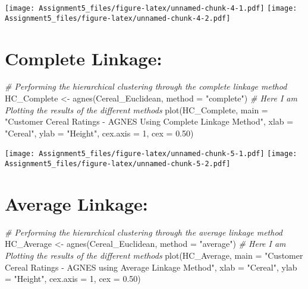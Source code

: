 \documentclass[
]{article}
\newenvironment{Shaded}{\begin{snugshade}}{\end{snugshade}}
\newcommand{\AttributeTok}[1]{\textcolor[rgb]{0.77,0.63,0.00}{#1}}
\newcommand{\CommentTok}[1]{\textcolor[rgb]{0.56,0.35,0.01}{\textit{#1}}}
\newcommand{\DecValTok}[1]{\textcolor[rgb]{0.00,0.00,0.81}{#1}}
\newcommand{\FloatTok}[1]{\textcolor[rgb]{0.00,0.00,0.81}{#1}}
\newcommand{\FunctionTok}[1]{\textcolor[rgb]{0.00,0.00,0.00}{#1}}
\newcommand{\NormalTok}[1]{#1}
\newcommand{\OtherTok}[1]{\textcolor[rgb]{0.56,0.35,0.01}{#1}}
\newcommand{\StringTok}[1]{\textcolor[rgb]{0.31,0.60,0.02}{#1}}
\begin{document}
\texttt{[image: Assignment5\_files/figure-latex/unnamed-chunk-4-1.pdf]}
\texttt{[image: Assignment5\_files/figure-latex/unnamed-chunk-4-2.pdf]}

\hypertarget{complete-linkage}{%
\section{Complete Linkage:}\label{complete-linkage}}

\begin{Shaded}
\begin{Highlighting}[]
\CommentTok{\# Performing the hierarchical clustering through the complete linkage method}
\NormalTok{HC\_Complete }\OtherTok{\textless{}{-}} \FunctionTok{agnes}\NormalTok{(Cereal\_Euclidean, }\AttributeTok{method =} \StringTok{"complete"}\NormalTok{)}
\CommentTok{\# Here I am Plotting the results of the different methods}
\FunctionTok{plot}\NormalTok{(HC\_Complete, }
     \AttributeTok{main =} \StringTok{"Customer Cereal Ratings {-} AGNES  Using Complete Linkage Method"}\NormalTok{,}
     \AttributeTok{xlab =} \StringTok{"Cereal"}\NormalTok{,}
     \AttributeTok{ylab =} \StringTok{"Height"}\NormalTok{,}
     \AttributeTok{cex.axis =} \DecValTok{1}\NormalTok{,}
     \AttributeTok{cex =} \FloatTok{0.50}\NormalTok{)}
\end{Highlighting}
\end{Shaded}

\texttt{[image: Assignment5\_files/figure-latex/unnamed-chunk-5-1.pdf]}
\texttt{[image: Assignment5\_files/figure-latex/unnamed-chunk-5-2.pdf]}

\hypertarget{average-linkage}{%
\section{Average Linkage:}\label{average-linkage}}

\begin{Shaded}
\begin{Highlighting}[]
\CommentTok{\# Performing the hierarchical clustering through the average linkage method}
\NormalTok{HC\_Average }\OtherTok{\textless{}{-}} \FunctionTok{agnes}\NormalTok{(Cereal\_Euclidean, }\AttributeTok{method =} \StringTok{"average"}\NormalTok{)}
\CommentTok{\# Here I am Plotting the results of the different methods}
\FunctionTok{plot}\NormalTok{(HC\_Average, }
     \AttributeTok{main =} \StringTok{"Customer Cereal Ratings {-} AGNES using Average Linkage Method"}\NormalTok{,}
     \AttributeTok{xlab =} \StringTok{"Cereal"}\NormalTok{,}
     \AttributeTok{ylab =} \StringTok{"Height"}\NormalTok{,}
     \AttributeTok{cex.axis =} \DecValTok{1}\NormalTok{,}
     \AttributeTok{cex =} \FloatTok{0.50}\NormalTok{)}
\end{Highlighting}
\end{Shaded}
\end{document}
